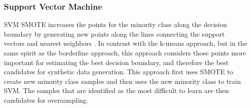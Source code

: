 \documentclass[letterpaper]{report}
\begin{document}
\subsubsection{Support Vector Machine}
SVM SMOTE increases the points for the minority class along the decision boundary by generating new points along the lines connecting the support vectors and nearest neighbors \parencite{Nguyen2011-cb}. In contrast with the k-means approach, but in the same spirit as the borderline approach, this approach considers those points more important for estimating the best decision boundary, and therefore the best candidates for synthetic data generation. This approach first uses SMOTE to create new minority class samples and then uses the new minority class to train SVM. The samples that are identified as the most difficult to learn are then candidates for oversampling.
\end{document}

